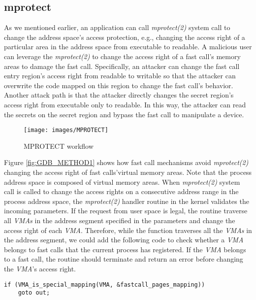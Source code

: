 \subsection{mprotect}
As we mentioned earlier, an application can call \emph{mprotect(2)}  
system call\cite{19} to change the address space's access protection, 
e.g., changing the access right of a particular area in the address 
space from executable to readable.  A malicious user can leverage the 
\emph{mprotect(2)} to change the access right of a fast call's memory areas to 
damage the fast call. Specifically, an attacker can change the fast 
call entry region's access right from readable to writable so that the attacker can overwrite 
the code mapped on this region to change the fast call's behavior. 
Another attack path is that the attacker directly changes the secret 
region's access right from executable only to readable. In this way, 
the attacker can read the secrets on the secret region and bypass the 
fast call to manipulate a device.
\begin{figure}[H]
  \centering
  \texttt{[image: images/MPROTECT]}
  \caption[Short description]{MPROTECT workflow}
  \label{fig:MPROTECT}
\end{figure}

Figure \ref{fig:GDB_METHOD1} shows how fast call mechanisms avoid \emph{mprotect(2)} 
changing the access right of fast calls'virtual memory areas. 
Note that the process address space\cite{10.5555/983550} is composed of virtual memory areas\cite{10.5555/983550}.  
When \emph{mprotect(2)} system call is called to change the access rights on a 
consecutive address range in the process address space, the \emph{mprotect(2)} 
handler routine in the kernel validates the incoming parameters. 
If the request from user space is legal, the routine 
traverse all \emph{VMAs} in the address segment specified in the parameters
 and change the access right of each \emph{VMA}. Therefore, while the function 
 traverses all the \emph{VMAs} in the address segment, we could add the following 
 code to check whether a \emph{VMA} belongs to fast calls that the current process 
 has registered. If the \emph{VMA} belongs to a fast call, the routine 
 should terminate and return an error before changing the \emph{VMA}'s access right.

\begin{lstlisting}[style=CStyle]
  if (VMA_is_special_mapping(VMA, &fastcall_pages_mapping))
    goto out;
\end{lstlisting}
 

